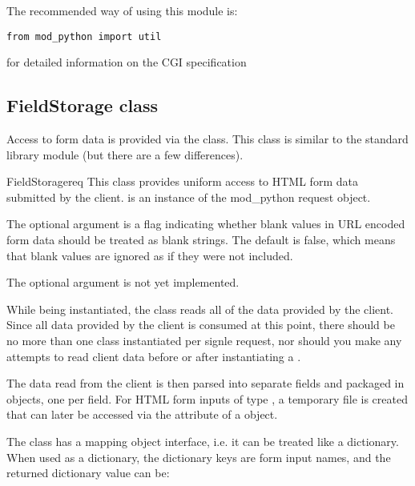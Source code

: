 The recommended way of using this module is:
\begin{verbatim}
from mod_python import util
\end{verbatim}

\begin{seealso}
	{for detailed information on the CGI specification}
\end{seealso}

\subsection{FieldStorage class\label{pyapi-util-fstor}}

Access to form data is provided via the 
class. This class is similar to the standard library module 
 (but there are a few differences).

\begin{classdesc}{FieldStorage}{req}
This class provides uniform access to HTML form data submitted by the client.
 is an instance of the mod_python request object.

The optional argument  is a flag indicating whether
blank values in URL encoded form data should be treated as blank strings. The
default is false, which means that blank values are ignored as if they were
not included.

The optional argument  is not yet implemented.
\end{classdesc}

While being instantiated, the  class reads all of
the data provided by the client. Since all data provided by the client
is consumed at this point, there should be no more than one
 class instantiated per signle request, nor should
you make any attempts to read client data before or after
instantiating a .

The data read from the client is then parsed into separate fields
and packaged in  objects, one per field. For HTML form
inputs of type , a temporary file is created that can later be 
accessed via the  attribute of a  object.

The  class has a mapping object interface, i.e. it
can be treated like a dictionary. When used as a dictionary, the dictionary 
keys are form input names, and the returned dictionary value can be:

